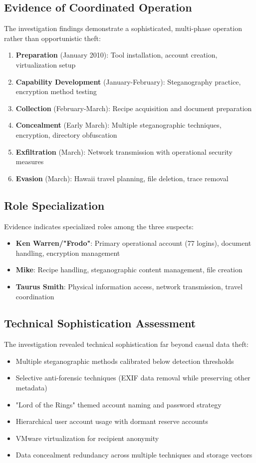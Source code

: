 \subsection{Evidence of Coordinated Operation}
The investigation findings demonstrate a sophisticated, multi-phase operation rather than opportunistic theft:

\begin{enumerate}
    \item \textbf{Preparation} (January 2010): Tool installation, account creation, virtualization setup
    \item \textbf{Capability Development} (January-February): Steganography practice, encryption method testing
    \item \textbf{Collection} (February-March): Recipe acquisition and document preparation
    \item \textbf{Concealment} (Early March): Multiple steganographic techniques, encryption, directory obfuscation
    \item \textbf{Exfiltration} (March): Network transmission with operational security measures
    \item \textbf{Evasion} (March): Hawaii travel planning, file deletion, trace removal
\end{enumerate}

\subsection{Role Specialization}
Evidence indicates specialized roles among the three suspects:
\begin{itemize}
    \item \textbf{Ken Warren/"Frodo"}: Primary operational account (77 logins), document handling, encryption management
    \item \textbf{Mike}: Recipe handling, steganographic content management, file creation
    \item \textbf{Taurus Smith}: Physical information access, network transmission, travel coordination
\end{itemize}

\subsection{Technical Sophistication Assessment}
The investigation revealed technical sophistication far beyond casual data theft:
\begin{itemize}
    \item Multiple steganographic methods calibrated below detection thresholds
    \item Selective anti-forensic techniques (EXIF data removal while preserving other metadata)
    \item "Lord of the Rings" themed account naming and password strategy
    \item Hierarchical user account usage with dormant reserve accounts
    \item VMware virtualization for recipient anonymity
    \item Data concealment redundancy across multiple techniques and storage vectors
\end{itemize}

